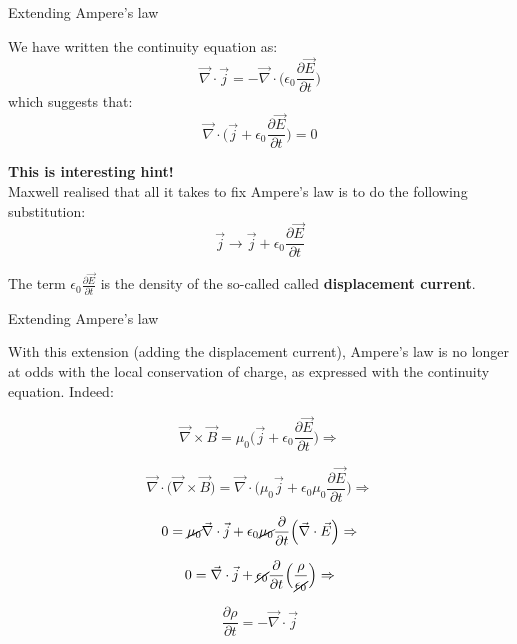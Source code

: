 %
%
%

\begin{frame}{Extending Ampere's law}

We have written the continuity equation as:
\begin{equation*}
  \vec{\nabla} \cdot \vec{j} = - \vec{\nabla} \cdot \Big( \epsilon_0 \frac{\partial \vec{E}}{\partial t} \Big)
\end{equation*}
which suggests that:
\begin{equation*}
  \vec{\nabla} \cdot \Big( \vec{j} + \epsilon_0 \frac{\partial \vec{E}}{\partial t} \Big) = 0
\end{equation*}

{\bf This is interesting hint!}\\
Maxwell realised that all it takes to fix Ampere's law is to do the following substitution:
\begin{equation*}
  \vec{j} \rightarrow
  \vec{j} + \epsilon_0 \frac{\partial \vec{E}}{\partial t}
\end{equation*}

The term $\displaystyle \epsilon_0 \frac{\partial \vec{E}}{\partial t}$ is the density
of the so-called called {\bf displacement current}.

\end{frame}

%
%
%

\begin{frame}{Extending Ampere's law}

With this extension (adding the displacement current), Ampere's law is no longer at odds with the
local conservation of charge, as expressed with the continuity equation. Indeed:

\begin{equation*}
  \vec{\nabla} \times \vec{B} =
      \mu_0 \Big( \vec{j} + \epsilon_0 \frac{\partial \vec{E}}{\partial t} \Big)  \Rightarrow
\end{equation*}

\begin{equation*}
  \vec{\nabla} \cdot \Big( \vec{\nabla} \times \vec{B} \Big) =
    \vec{\nabla} \cdot \Big( \mu_0 \vec{j} + \epsilon_0 \mu_0 \frac{\partial \vec{E}}{\partial t} \Big)  \Rightarrow
\end{equation*}

\begin{equation*}
  0 =
    \cancel{\mu_0} \vec{\nabla} \cdot \vec{j} + \epsilon_0 \cancel{\mu_0} \frac{\partial}{\partial t}
    \Big( \vec{\nabla} \cdot  \vec{E}\Big)  \Rightarrow
\end{equation*}

\begin{equation*}
  0 =
    \vec{\nabla} \cdot \vec{j} + \cancel{\epsilon_0} \frac{\partial}{\partial t}
      \Big( \frac{\rho}{\cancel{\epsilon_0}} \Big)  \Rightarrow
\end{equation*}

\begin{equation*}
    \frac{\partial \rho}{\partial t} = - \vec{\nabla} \cdot \vec{j}
\end{equation*}

\end{frame}


